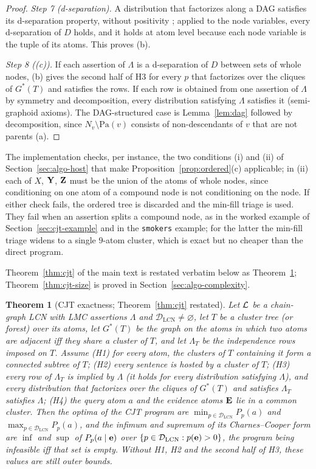 \documentclass{article} %
\newtheorem{theorem}{Theorem}
\newcommand{\DLCN}{\mathcal{D}_{\mathrm{LCN}}}
\providecommand{\Pa}{\mathrm{Pa}}
\begin{document}
\begin{proof}
\emph{Step 7 (d-separation).} A distribution that factorizes along a DAG
satisfies its d-separation property, without positivity
\citep[Thm.~3.27]{lauritzen96}; applied to the node variables, every d-separation
of $D$ holds, and it holds at atom level because each node variable is the tuple of
its atoms. This proves (b).

\emph{Step 8 ((c)).} If each assertion of $\Lambda$ is a d-separation of $D$
between sets of whole nodes, (b) gives the second half of H3 for every $p$ that
factorizes over the cliques of $G^\ast(T)$ and satisfies the rows. If each row is
obtained from one assertion of $\Lambda$ by symmetry and decomposition, every
distribution satisfying $\Lambda$ satisfies it (semi-graphoid axioms). The
DAG-structured case is Lemma~\ref{lem:dag} followed by decomposition, since
$N_v\setminus\Pa(v)$ consists of non-descendants of $v$ that are not parents (a).
\end{proof}

The implementation checks, per instance, the two conditions (i) and (ii) of
Section~\ref{sec:algo-host} that make Proposition~\ref{prop:ordered}(c)
applicable; in (ii) each of $X$, $\mathbf{Y}$, $\mathbf{Z}$ must be the union of the atoms of
whole nodes, since conditioning on one atom of a compound node is not
conditioning on the node. If either check fails, the ordered tree is discarded and
the min-fill triage is used. They fail when an assertion splits a compound node,
as in the worked example of Section~\ref{sec:cjt-example} and in the
\texttt{smokers} example; for the latter the min-fill triage widens to a single
$9$-atom cluster, which is exact but no cheaper than the direct program.

Theorem~\ref{thm:cjt} of the main text is restated verbatim below as
Theorem~\ref{thm:d5}; Theorem~\ref{thm:cjt-size} is proved in
Section~\ref{sec:algo-complexity}.

\begin{theorem}[\textsc{CJT} exactness; Theorem~\ref{thm:cjt} restated]\label{thm:d5}
Let $\mathcal{L}$ be a chain-graph LCN with LMC assertions $\Lambda$ and
$\DLCN\neq\varnothing$, let $T$ be a cluster tree (or forest) over its atoms, let
$G^\ast(T)$ be the graph on the atoms in which two atoms are adjacent iff they
share a cluster of $T$, and let $\Lambda_T$ be the independence rows imposed on
$T$. Assume \textup{(H1)} for every atom, the clusters of $T$ containing it form
a connected subtree of $T$; \textup{(H2)} every sentence is hosted by a cluster
of $T$; \textup{(H3)} every row of $\Lambda_T$ is implied by $\Lambda$ (it holds
for every distribution satisfying $\Lambda$), and every distribution that
factorizes over the cliques of $G^\ast(T)$ and satisfies $\Lambda_T$ satisfies
$\Lambda$; \textup{(H4)} the query atom $a$ and the evidence atoms $\mathbf{E}$ lie in a
common cluster. Then the optima of the CJT program are $\min_{p\in\DLCN}P_p(a)$
and $\max_{p\in\DLCN}P_p(a)$, and the infimum and supremum of its
Charnes--Cooper form are $\inf$ and $\sup$ of $P_p(a\mid\mathbf{e})$ over
$\{p\in\DLCN:p(\be)>0\}$, the program being infeasible iff that set is empty.
Without H1, H2 and the second half of H3, these values are still outer bounds.
\end{theorem}
\end{document}
